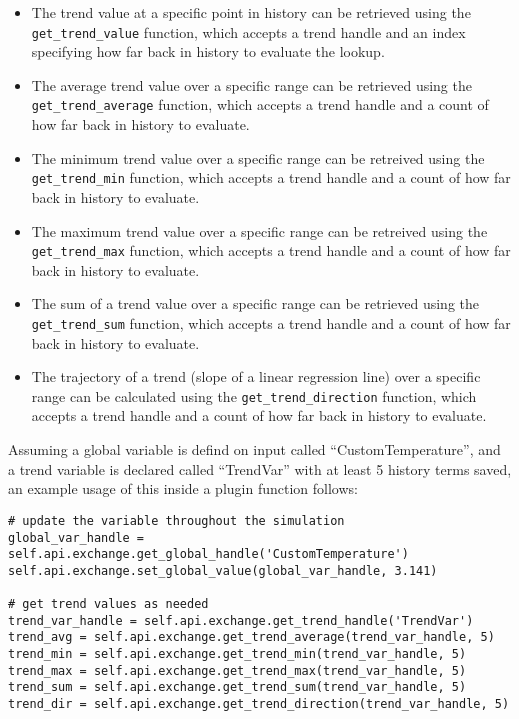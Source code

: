 \begin{itemize}
    \item The trend value at a specific point in history can be retrieved using the \verb=get_trend_value= function, which accepts a trend handle and an index specifying how far back in history to evaluate the lookup.
    \item The average trend value over a specific range can be retrieved using the \verb=get_trend_average= function, which accepts a trend handle and a count of how far back in history to evaluate.
    \item The minimum trend value over a specific range can be retreived using the \verb=get_trend_min= function, which accepts a trend handle and a count of how far back in history to evaluate.
    \item The maximum trend value over a specific range can be retreived using the \verb=get_trend_max= function, which accepts a trend handle and a count of how far back in history to evaluate.
    \item The sum of a trend value over a specific range can be retrieved using the \verb=get_trend_sum= function, which accepts a trend handle and a count of how far back in history to evaluate.
    \item The trajectory of a trend (slope of a linear regression line) over a specific range can be calculated using the \verb=get_trend_direction= function, which accepts a trend handle and a count of how far back in history to evaluate.
\end{itemize}

Assuming a global variable is defind on input called ``CustomTemperature'', and a trend variable is declared called ``TrendVar'' with at least 5 history terms saved, an example usage of this inside a plugin function follows:

\begin{lstlisting}
# update the variable throughout the simulation
global_var_handle = self.api.exchange.get_global_handle('CustomTemperature')
self.api.exchange.set_global_value(global_var_handle, 3.141)

# get trend values as needed
trend_var_handle = self.api.exchange.get_trend_handle('TrendVar')
trend_avg = self.api.exchange.get_trend_average(trend_var_handle, 5)
trend_min = self.api.exchange.get_trend_min(trend_var_handle, 5)
trend_max = self.api.exchange.get_trend_max(trend_var_handle, 5)
trend_sum = self.api.exchange.get_trend_sum(trend_var_handle, 5)
trend_dir = self.api.exchange.get_trend_direction(trend_var_handle, 5)
\end{lstlisting}

